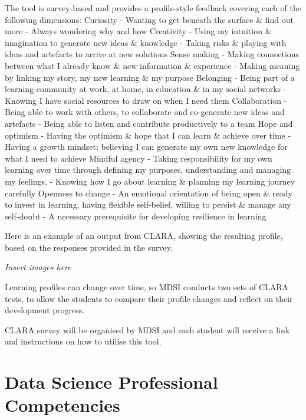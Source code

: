 \documentclass[]{book}
\theoremstyle{definition}
\theoremstyle{definition}
\theoremstyle{remark}
\begin{document}
The tool is survey-based and provides a profile-style feedback covering
each of the following dimensions: Curiosity - Wanting to get beneath the
surface \& find out more - Always wondering why and how Creativity -
Using my intuition \& imagination to generate new ideas \& knowledge -
Taking risks \& playing with ideas and artefacts to arrive at new
solutions Sense making - Making connections between what I already know
\& new information \& experience - Making meaning by linking my story,
my new learning \& my purpose Belonging - Being part of a learning
community at work, at home, in education \& in my social networks -
Knowing I have social resources to draw on when I need them
Collaboration - Being able to work with others, to collaborate and
co-generate new ideas and artefacts - Being able to listen and
contribute productively to a team Hope and optimism - Having the
optimism \& hope that I can learn \& achieve over time - Having a growth
mindset; believing I can generate my own new knowledge for what I need
to achieve Mindful agency - Taking responsibility for my own learning
over time through defining my purposes, understanding and managing my
feelings, - Knowing how I go about learning \& planning my learning
journey carefully Openness to change - An emotional orientation of being
open \& ready to invest in learning, having flexible self-belief,
willing to persist \& manage any self-doubt - A necessary prerequisite
for developing resilience in learning

Here is an example of an output from CLARA, showing the resulting
profile, based on the responses provided in the survey.

\emph{Insert images here}

Learning profiles can change over time, so MDSI conducts two sets of
CLARA tests, to allow the students to compare their profile changes and
reflect on their development progress.

CLARA survey will be organised by MDSI and each student will receive a
link and instructions on how to utilise this tool.

\section{Data Science Professional
Competencies}\label{data-science-professional-competencies}
\end{document}
